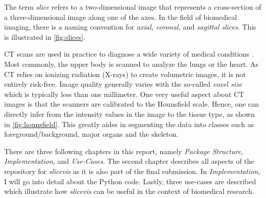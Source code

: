 The term \emph{slice} refers to a two-dimensional image that represents a cross-section of a three-dimensional image along one of the axes. In the field of biomedical imaging, there is a naming convention for \emph{axial, coronal, } and \emph{sagittal slices}. This is illustrated in \cref{fig:slices}. 


CT scans are used in practice to diagnose a wide variety of medical conditions \cite{ct}. Most commonly, the upper body is scanned to analyze the lungs or the heart. As CT relies on ionizing radiation (X-rays) to create volumetric images, it is not entirely risk-free. Image quality generally varies with the so-called \emph{voxel size} which is typically less than one millimeter. One very useful aspect about CT images is that the scanners are calibrated to the Hounsfield scale. Hence, one can directly infer from the intensity values in the image to the tissue type, as shown in \cref{fig:hounsfield}. This greatly aides in segmenting the data into classes such as foreground/background, major organs and the skeleton. 

There are three following chapters in this report, namely \emph{Package Structure, Implementation,} and \emph{Use-Cases}. The second chapter describes all aspects of the repository for \emph{slicevis} as it is also part of the final submission. In \emph{Implementation}, I will go into detail about the Python code. Lastly, three use-cases are described which illustrate how \emph{slicevis} can be useful in the context of biomedical research.
